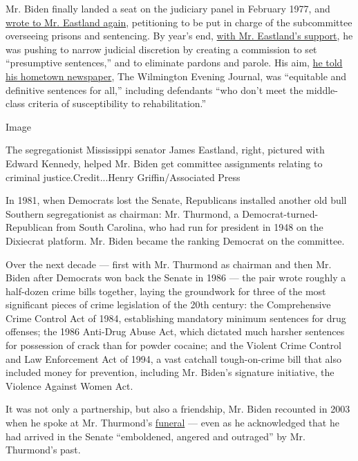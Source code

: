 Mr. Biden finally landed a seat on the judiciary panel in February 1977,
and
\href{https://int.graylady3jvrrxbe.onion/data/documenthelper/1333-letter-from-biden-to-eastland/02c8ce49f0cfce13912f/optimized/full.pdf\#page=1}{wrote
to Mr. Eastland again}, petitioning to be put in charge of the
subcommittee overseeing prisons and sentencing. By year's end,
\href{https://int.graylady3jvrrxbe.onion/data/documenthelper/1335-letter-from-biden-to-eastland/02c8ce49f0cfce13912f/optimized/full.pdf\#page=1}{with
Mr. Eastland's support}, he was pushing to narrow judicial discretion by
creating a commission to set ``presumptive sentences,'' and to eliminate
pardons and parole. His aim,
\href{https://int.graylady3jvrrxbe.onion/data/documenthelper/1344-biden-clipping-01/7396c2788d9e76aee74b/optimized/full.pdf\#page=1}{he
told his hometown newspaper}, The Wilmington Evening Journal, was
``equitable and definitive sentences for all,'' including defendants
``who don't meet the middle-class criteria of susceptibility to
rehabilitation.''

Image

The segregationist Mississippi senator James Eastland, right, pictured
with Edward Kennedy, helped Mr. Biden get committee assignments relating
to criminal justice.Credit...Henry Griffin/Associated Press

In 1981, when Democrats lost the Senate, Republicans installed another
old bull Southern segregationist as chairman: Mr. Thurmond, a
Democrat-turned-Republican from South Carolina, who had run for
president in 1948 on the Dixiecrat platform. Mr. Biden became the
ranking Democrat on the committee.

Over the next decade --- first with Mr. Thurmond as chairman and then
Mr. Biden after Democrats won back the Senate in 1986 --- the pair wrote
roughly a half-dozen crime bills together, laying the groundwork for
three of the most significant pieces of crime legislation of the 20th
century: the Comprehensive Crime Control Act of 1984, establishing
mandatory minimum sentences for drug offenses; the 1986 Anti-Drug Abuse
Act, which dictated much harsher sentences for possession of crack than
for powder cocaine; and the Violent Crime Control and Law Enforcement
Act of 1994, a vast catchall tough-on-crime bill that also included
money for prevention, including Mr. Biden's signature initiative, the
Violence Against Women Act.

It was not only a partnership, but also a friendship, Mr. Biden
recounted in 2003 when he spoke at Mr. Thurmond's
\href{https://t.co/9w8FgtQdp2}{funeral} --- even as he acknowledged that
he had arrived in the Senate ``emboldened, angered and outraged'' by Mr.
Thurmond's past.

